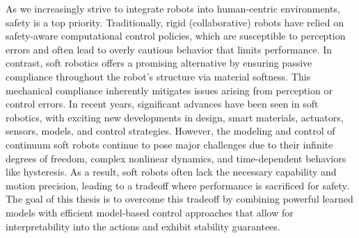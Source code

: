 As we increasingly strive to integrate robots into human-centric environments, safety is a top priority. Traditionally, rigid (collaborative) robots have relied on safety-aware computational control policies, which are susceptible to perception errors and often lead to overly cautious behavior that limits performance. In contrast, soft robotics offers a promising alternative by ensuring passive compliance throughout the robot’s structure via material softness. This mechanical compliance inherently mitigates issues arising from perception or control errors. In recent years, significant advances have been seen in soft robotics, with exciting new developments in design, smart materials, actuators, sensors, models, and control strategies. However, the modeling and control of continuum soft robots continue to pose major challenges due to their infinite degrees of freedom, complex nonlinear dynamics, and time-dependent behaviors like hysteresis. As a result, soft robots often lack the necessary capability and motion precision, leading to a tradeoff where performance is sacrificed for safety. The goal of this thesis is to overcome this tradeoff by combining powerful learned models with efficient model-based control approaches that allow for interpretability into the actions and exhibit stability guarantees.

